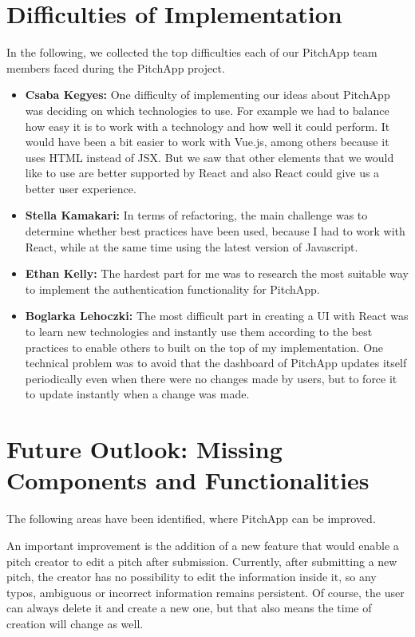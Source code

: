 \chapter{Difficulties of Implementation}
In the following, we collected the top difficulties each of our PitchApp team members faced during the PitchApp project.

\begin{itemize}
	\item \textbf{Csaba Kegyes:} One difficulty of implementing our ideas about PitchApp was deciding on which technologies to use. For example we had to balance how easy it is to work with a technology and how well it could perform. It would have been a bit easier to work with Vue.js, among others because it uses HTML instead of JSX. But we saw that other elements that we would like to use are better supported by React and also React could give us a better user experience.
    \item \textbf{Stella Kamakari:} In terms of refactoring, the main challenge was to determine whether best practices have been used, because I had to work with React, while at the same time using the latest version of Javascript.
	\item \textbf{Ethan Kelly:} The hardest part for me was to research the most suitable way to implement the authentication functionality for PitchApp.
	\item \textbf{Boglarka Lehoczki:} The most difficult part in creating a UI with React was to learn new technologies and instantly use them according to the best practices to enable others to built on the top of my implementation. One technical problem was to avoid that the dashboard of PitchApp updates itself periodically even when there were no changes made by users, but to force it to update instantly when a change was made.

\end{itemize}
\chapter{Future Outlook: Missing Components and Functionalities}


The following areas have been identified, where PitchApp can be improved.

An important improvement is the addition of a new feature that would enable a pitch creator to edit a pitch after submission. Currently, after submitting a new pitch, the creator has no possibility to edit the information inside it, so any typos, ambiguous or incorrect information remains persistent. Of course, the user can always delete it and create a new one, but that also means the time of creation will change as well.

